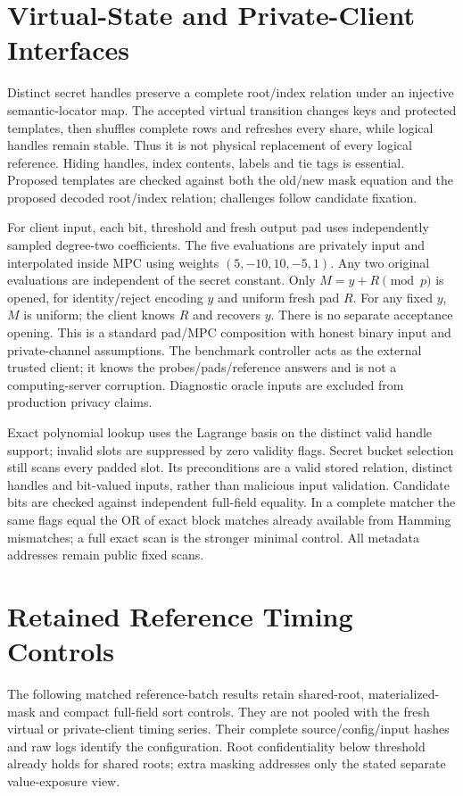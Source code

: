 \section{Virtual-State and Private-Client Interfaces}
Distinct secret handles preserve a complete root/index relation under an injective semantic-locator map. The accepted virtual transition changes keys and protected templates, then shuffles complete rows and refreshes every share, while logical handles remain stable. Thus it is not physical replacement of every logical reference. Hiding handles, index contents, labels and tie tags is essential. Proposed templates are checked against both the old/new mask equation and the proposed decoded root/index relation; challenges follow candidate fixation.

For client input, each bit, threshold and fresh output pad uses independently sampled degree-two coefficients. The five evaluations are privately input and interpolated inside MPC using weights $(5,-10,10,-5,1)$. Any two original evaluations are independent of the secret constant. Only $M=y+R\pmod p$ is opened, for identity/reject encoding $y$ and uniform fresh pad $R$. For any fixed $y$, $M$ is uniform; the client knows $R$ and recovers $y$. There is no separate acceptance opening. This is a standard pad/MPC composition with honest binary input and private-channel assumptions. The benchmark controller acts as the external trusted client; it knows the probes/pads/reference answers and is not a computing-server corruption. Diagnostic oracle inputs are excluded from production privacy claims.

Exact polynomial lookup uses the Lagrange basis on the distinct valid handle support; invalid slots are suppressed by zero validity flags. Secret bucket selection still scans every padded slot. Its preconditions are a valid stored relation, distinct handles and bit-valued inputs, rather than malicious input validation. Candidate bits are checked against independent full-field equality. In a complete matcher the same flags equal the OR of exact block matches already available from Hamming mismatches; a full exact scan is the stronger minimal control. All metadata addresses remain public fixed scans.

\section{Retained Reference Timing Controls}
The following matched reference-batch results retain shared-root, materialized-mask and compact full-field sort controls. They are not pooled with the fresh virtual or private-client timing series. Their complete source/config/input hashes and raw logs identify the configuration. Root confidentiality below threshold already holds for shared roots; extra masking addresses only the stated separate value-exposure view.

